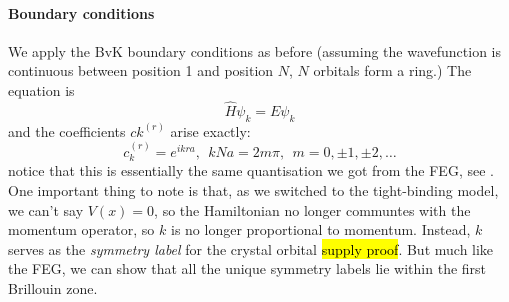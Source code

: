 \paragraph{Boundary conditions}
We apply the BvK boundary conditions as before (assuming the wavefunction is continuous between position 1 and position $N$, \ie $N$ orbitals form a ring.) The \sch equation is
\begin{equation}
	\hat{H}\psi_k=E\psi_k
\end{equation}
and the coefficients $ck^{(r)}$ arise exactly:
\begin{equation}
	c_k^{(r)}=e^{ikra},\ \ kNa=2m\pi,\ \ m=0,\pm1,\pm2,\dots
\end{equation}
notice that this is essentially the same quantisation we got from the FEG, see . One important thing to note is that, as we switched to the tight-binding model, we can't say $V(x)=0$, so the Hamiltonian no longer communtes with the momentum operator, so $k$ is no longer proportional to momentum. Instead, $k$ serves as the \emph{symmetry label} for the crystal orbital \hl{supply proof}. But much like the FEG, we can show that all the unique symmetry labels lie within the first Brillouin zone.\par
